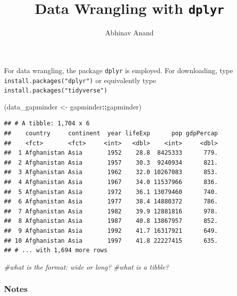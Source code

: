 \documentclass[11pt,]{article}
\title{Data Wrangling with \texttt{dplyr}}
\author{Abhinav Anand}
\date{}
\newenvironment{Shaded}{\begin{snugshade}}{\end{snugshade}}
\newcommand{\StringTok}[1]{\textcolor[rgb]{0.31,0.60,0.02}{#1}}
\newcommand{\CommentTok}[1]{\textcolor[rgb]{0.56,0.35,0.01}{\textit{#1}}}
\newcommand{\OperatorTok}[1]{\textcolor[rgb]{0.81,0.36,0.00}{\textbf{#1}}}
\newcommand{\NormalTok}[1]{#1}
\begin{document}
\maketitle

For data wrangling, the package \texttt{dplyr} is employed. For
downloading, type \texttt{install.packages("dplyr")} or equivalently
type \texttt{install.packages("tidyverse")}

\begin{Shaded}
\begin{Highlighting}[]
\NormalTok{(data_gapminder <-}\StringTok{ }\NormalTok{gapminder}\OperatorTok{::}\NormalTok{gapminder)}
\end{Highlighting}
\end{Shaded}

\begin{verbatim}
## # A tibble: 1,704 x 6
##    country     continent  year lifeExp      pop gdpPercap
##    <fct>       <fct>     <int>   <dbl>    <int>     <dbl>
##  1 Afghanistan Asia       1952    28.8  8425333      779.
##  2 Afghanistan Asia       1957    30.3  9240934      821.
##  3 Afghanistan Asia       1962    32.0 10267083      853.
##  4 Afghanistan Asia       1967    34.0 11537966      836.
##  5 Afghanistan Asia       1972    36.1 13079460      740.
##  6 Afghanistan Asia       1977    38.4 14880372      786.
##  7 Afghanistan Asia       1982    39.9 12881816      978.
##  8 Afghanistan Asia       1987    40.8 13867957      852.
##  9 Afghanistan Asia       1992    41.7 16317921      649.
## 10 Afghanistan Asia       1997    41.8 22227415      635.
## # ... with 1,694 more rows
\end{verbatim}

\begin{Shaded}
\begin{Highlighting}[]
\CommentTok{#what is the format: wide or long?}
\CommentTok{#what is a tibble?}
\end{Highlighting}
\end{Shaded}

\subsubsection{Notes}\label{notes}
\end{document}
